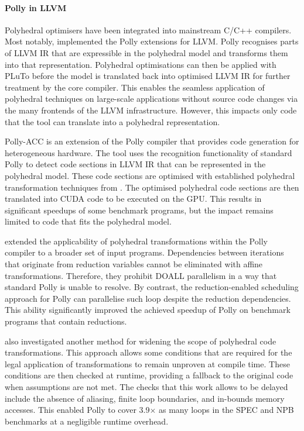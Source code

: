     \paragraph*{Polly in LLVM}
    Polyhedral optimisers have been integrated into mainstream C/C++ compilers.
    Most notably, \citet{Lengauer2012Polly} implemented the Polly extensions for
    LLVM.
    Polly recognises parts of LLVM IR that are expressible in the polyhedral
    model and transforms them into that representation.
    Polyhedral optimisations can then be applied with PLuTo
    \citep{Bondhugula:2008:PAP:1375581.1375595} before the model is
    translated back into optimised LLVM IR for further treatment by the core
    compiler.
    This enables the seamless application of polyhedral techniques on
    large-scale applications without source code changes via the many
    frontends of the LLVM infrastructure.
    However, this impacts only code that the tool can translate
    into a polyhedral representation.

    Polly-ACC \citep{polly-acc} is an extension of the Polly compiler that
    provides code generation for heterogeneous hardware.
    The tool uses the recognition functionality of standard Polly to detect
    code sections in LLVM IR that can be represented in the polyhedral model.
    These code sections are optimised with established polyhedral
    transformation techniques from \citet{Lengauer2012Polly}.
    The optimised polyhedral code sections are then translated into
    CUDA code to be executed on the GPU.
    This results in significant speedups of some benchmark programs, but the
    impact remains limited to code that fits the polyhedral model.

    \citet{Doerfert2015Polly} extended the applicability of polyhedral
    transformations within the Polly compiler to a broader set of input
    programs.
    Dependencies between iterations that originate from reduction variables
    cannot be eliminated with affine transformations.
    Therefore, they prohibit DOALL parallelism in a way that standard Polly is
    unable to resolve.
    By contrast, the reduction-enabled scheduling approach for Polly can
    parallelise such loop despite the reduction dependencies.
    This ability significantly improved the achieved speedup of Polly on
    benchmark programs that contain reductions.

    \citet{Doerfert:2017:OLO:3049832.3049864} also investigated another method
    for widening the scope of polyhedral code transformations.
    This approach allows some conditions that are required for the legal
    application of transformations to remain unproven at compile time.
    These conditions are then checked at runtime, providing a fallback to the
    original code when assumptions are not met.
    The checks that this work allows to be delayed include the absence of
    aliasing, finite loop boundaries, and in-bounds memory accesses.
    This enabled Polly to cover 3.9$\times$ as many loops in the SPEC and NPB
    benchmarks at a negligible runtime overhead.

